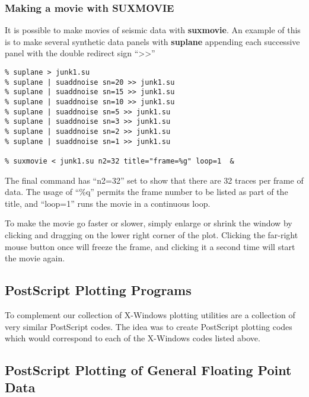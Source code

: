 {{{{{\subsubsection{Making a movie with SUXMOVIE}

It is possible to make movies of seismic data with {\bf suxmovie\/}.
An example of this is to make several synthetic data panels with {\bf  suplane\/}
appending each successive panel with the double redirect sign ``>>''

{\small\begin{verbatim}
% suplane > junk1.su
% suplane | suaddnoise sn=20 >> junk1.su
% suplane | suaddnoise sn=15 >> junk1.su
% suplane | suaddnoise sn=10 >> junk1.su
% suplane | suaddnoise sn=5 >> junk1.su
% suplane | suaddnoise sn=3 >> junk1.su
% suplane | suaddnoise sn=2 >> junk1.su
% suplane | suaddnoise sn=1 >> junk1.su

% suxmovie < junk1.su n2=32 title="frame=%g" loop=1  &
\end{verbatim}}\noindent
The final command has ``n2=32'' set to show that there are 32 traces
per frame of data. The usage of ``\%q'' permits the frame
number to be listed as part of the title, and ``loop=1'' runs the
movie in a continuous loop.

To make the movie go faster or slower, simply enlarge or shrink the
window by clicking and dragging on the lower right corner of the plot.
Clicking the far-right mouse button once will freeze the frame, and clicking
it a second time will start the movie again.

\subsection{PostScript Plotting Programs}

To complement our collection of X-Windows plotting utilities
are a collection of very similar PostScript codes.
The idea was to create PostScript plotting codes which would
correspond to each of the X-Windows codes listed above.

\subsection{PostScript Plotting of General Floating Point Data}

}}}}}
